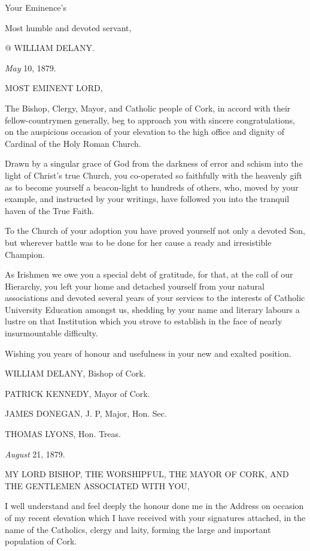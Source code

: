 Your Eminence's

Most humble and devoted servant,

@ WILLIAM DELANY.


\emph{May} 10, 1879.

MOST EMINENT LORD,

The Bishop, Clergy, Mayor, and Catholic people of Cork, in accord with
their fellow-countrymen generally, beg to approach you with sincere
congratulations, on the auspicious occasion of your elevation to the
high office and dignity of Cardinal of the Holy Roman Church.

Drawn by a singular grace of God from the darkness of error and
schism into the light of Christ's true Church, you co-operated so
faithfully with the heavenly gift as to become yourself a beacon-light
to hundreds of others, who, moved by your example, and instructed by
your writings, have followed you into the tranquil haven of the True
Faith.

To the Church of your adoption you have proved yourself not only a
devoted Son, but wherever battle was to be done for her cause a
ready and irresistible Champion.

As Irishmen we owe you a special debt of gratitude, for that, at
the call of our Hierarchy, you left your home and detached yourself
from your natural associations and devoted several years of your
services to the interests of Catholic University Education amongst us,
shedding by your name and literary labours a lustre on that
Institution which you strove to establish in the face of nearly
insurmountable difficulty.

Wishing you years of honour and usefulness in your new and exalted
position.

WILLIAM DELANY, Bishop
of Cork.

PATRICK KENNEDY, Mayor of
Cork.

JAMES DONEGAN, J. P,
Major, Hon. Sec.

THOMAS LYONS, Hon. Treas.


\emph{August} 21, 1879.

MY LORD BISHOP,
THE WORSHIPFUL, THE
MAYOR OF CORK,
AND THE GENTLEMEN
ASSOCIATED WITH YOU,

I well understand and feel deeply the honour done me in the Address on
occasion of my recent elevation which I have received with your
signatures attached, in the name of the Catholics, clergy and
laity, forming the large and important population of Cork.


